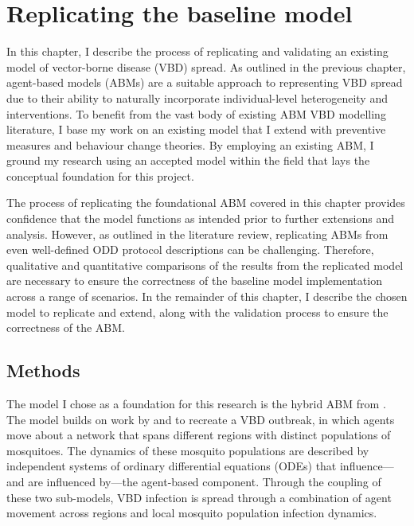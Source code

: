 \section{Replicating the baseline model}\label{sec:baseline_model}

In this chapter, I describe the process of replicating and validating an existing model of vector-borne disease (VBD) spread. As outlined in the previous chapter, agent-based models (ABMs) are a suitable approach to representing VBD spread due to their ability to naturally incorporate individual-level heterogeneity and interventions. To benefit from the vast body of existing ABM VBD modelling literature, I base my work on an existing model that I extend with preventive measures and behaviour change theories. By employing an existing ABM, I ground my research using an accepted model within the field that lays the conceptual foundation for this project.

The process of replicating the foundational ABM covered in this chapter provides confidence that the model functions as intended prior to further extensions and analysis. However, as outlined in the literature review, replicating ABMs from even well-defined ODD protocol descriptions can be challenging. Therefore, qualitative and quantitative comparisons of the results from the replicated model are necessary to ensure the correctness of the baseline model implementation across a range of scenarios. In the remainder of this chapter, I describe the chosen model to replicate and extend, along with the validation process to ensure the correctness of the ABM.

\subsection{Methods}

The model I chose as a foundation for this research is the hybrid ABM from \citet{manore_network-patch_2015}. The model builds on work by \citet{adams_man_2009} and \citet{perkins_heterogeneity_2013} to recreate a VBD outbreak, in which agents move about a network that spans different regions with distinct populations of mosquitoes. The dynamics of these mosquito populations are described by independent systems of ordinary differential equations (ODEs) that influence---and are influenced by---the agent-based component. Through the coupling of these two sub-models, VBD infection is spread through a combination of agent movement across regions and local mosquito population infection dynamics.

